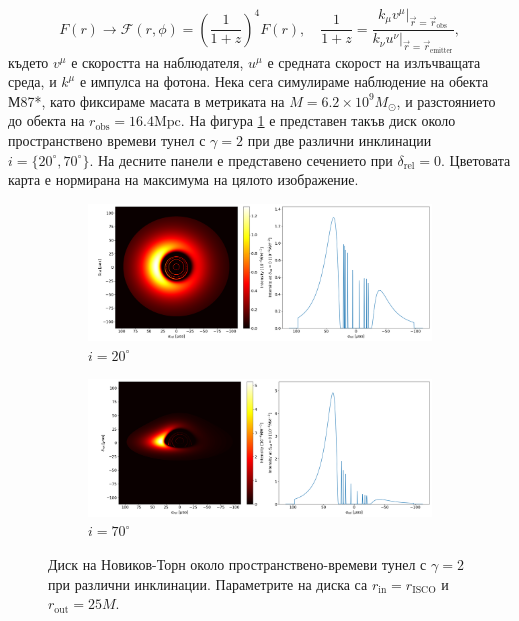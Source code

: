 \documentclass[12pt]{article}
\numberwithin{equation}{section}
\numberwithin{figure}{section}
\begin{document}
	\begin{equation}
		F(r)\rightarrow\mathcal{F}(r,\phi) = \left(\frac{1}{1+z} \right)^4 F(r),\quad \frac{1}{1 + z} = \frac{k_\mu v^\mu\vert_{\vec{r} = \vec{r}_\text{obs}}}{k_\nu u^\nu\vert_{\vec{r} = \vec{r}_\text{emitter}}},
	\end{equation}
	където $v^\mu$ е скоростта на наблюдателя, $u^\mu$ е средната скорост на излъчващата среда, и $k^\mu$ е импулса на фотона. Нека сега симулираме наблюдение на обекта М87*, като фиксираме масата в метриката на $M = 6.2\times10^9 M_\odot$, и разстоянието до обекта на $r_\text{obs} = 16.4 \text{Mpc}$. На фигура \ref{WH_NT} е представен такъв диск около пространствено времеви тунел с $\gamma = 2$ при две различни инклинации $i=\{20^\circ, 70^\circ\}$. На десните панели е представено сечението при $\delta_\text{rel} = 0$. Цветовата карта е нормирана на максимума на цялото изображение. \\
	
	\begin{figure}[!htb]
		\centering
		\begin{subfigure}{12cm}
			\hspace{-0.6cm}
			\includegraphics[scale = 0.26]{Section_6_Morphology_of_the images_of_horizonless_spacetimes/WH_NT_Gamma2_20_deg.png}
			\caption{$i = 20^\circ$} 
		\end{subfigure}
		\begin{subfigure}{12cm}
			\hspace{-0.6cm}
			\includegraphics[scale = 0.26]{Section_6_Morphology_of_the images_of_horizonless_spacetimes/WH_NT_Gamma2_70_deg.png}
			\caption{$i = 70^\circ$} 
		\end{subfigure}
		\caption[Диск на Новиков-Торн около пространствено-времеви тунел при различни инклинации.]{\small Диск на Новиков-Торн около пространствено-времеви тунел с $\gamma = 2$ при различни инклинации. Параметрите на диска са $r_\text{in} = r_\text{ISCO}$ и $r_\text{out} = 25M$.} 
		\label{WH_NT}
	\end{figure}
	
\end{document}
